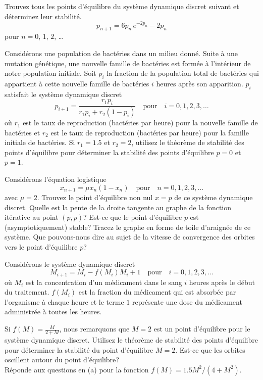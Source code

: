 \begin{question}[\life]
Trouvez tous les points d'équilibre du système dynamique discret
suivant et déterminez leur stabilité.
\[
p_{n+1} = 6 p_n\, e^{-2p_n} - 2 p_n
\]
pour $n=0$, $1$, $2$, \ldots  
\label{6Q103}
\end{question}

\begin{question}[\life]
Considérons une population de bactéries dans un milieu donné.  Suite à une
mutation génétique, une nouvelle famille de bactéries est formée à 
l'intérieur de notre population initiale.  Soit $p_i$ la fraction de la
population total de bactéries qui appartient à cette nouvelle famille de
bactéries $i$ heures après son apparition.  $p_i$ satisfait le
système dynamique discret
\[
p_{i+1} = \frac{r_1 p_i}{r_1 p_i + r_2 (1-p_i)} \quad \text{pour}
\quad i =0, 1, 2, 3, \ldots
\]
où $r_1$ est le taux de reproduction (bactéries par heure) pour la
nouvelle famille de bactéries et $r_2$ est le taux de reproduction
(bactéries par heure) pour la famille initiale de bactéries.  Si $r_1 = 1.5$
et $r_2 = 2$, utilisez le théorème de stabilité des points d'équilibre pour
déterminer la stabilité des points d'équilibre $p=0$ et $p=1$.
\label{6Q104}
\end{question}

\begin{question}[\life]
Considérons l'équation logistique
\[
x_{n+1} = \mu x_n ( 1- x_n) \quad \text{pour} \quad n=0, 1, 2, 3, \ldots
\]
avec $\mu = 2$.  Trouvez le point d'équilibre non nul $x=p$ de ce
système dynamique discret.  Quelle est la pente de la droite tangente
au graphe de la fonction itérative au point $(p,p)$?  Est-ce que le
point d'équilibre $p$ est (asymptotiquement) stable?  Tracez le graphe
en forme de toile d'araignée de ce système.  Que pouvons-nous dire au
sujet de la vitesse de convergence des orbites vers le point
d'équilibre $p$?
\label{6Q105}
\end{question}

\begin{question}[\life]
Considérons le système dynamique discret
\[
M_{i+1} = M_i - f(M_i) M_i + 1 \quad \text{pour} \quad i =0, 1, 2, 3, \ldots
\]
où $M_i$ est la concentration d'un médicament dans le sang $i$ heures après
le début du traitement.  $f(M_i)$ est la fraction du médicament qui est
absorbée par l'organisme à chaque heure et le terme $1$ représente une dose
du médicament administrée à toutes les heures.

 Si $\displaystyle f(M) = \frac{M}{2+M}$, nous remarquons que
$M=2$ est un point d'équilibre pour le système dynamique discret.
Utilisez le théorème de stabilité des points d'équilibre pour
déterminer la stabilité du point d'équilibre $M=2$.  Est-ce que les
orbites oscillent autour du point d'équilibre?\\
 Réponde aux questions en (a) pour la fonction
$f(M) = 1.5 M^2/(4+M^2)$.
\label{6Q106}
\end{question}

